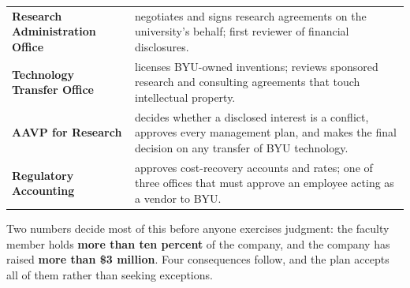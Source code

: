 \documentclass[11pt]{article}
\begin{document}
{\small
\setlength{\extrarowheight}{2pt}
\begin{tabular}{@{} >{\RaggedRight\arraybackslash}p{2.1in} >{\RaggedRight\arraybackslash}p{4.35in} @{}}
\textbf{Research Administration Office} &
negotiates and signs research agreements on the university's behalf; first
reviewer of financial disclosures. \\
\textbf{Technology Transfer Office} &
licenses BYU-owned inventions; reviews sponsored research and consulting
agreements that touch intellectual property. \\
\textbf{AAVP for Research} &
decides whether a disclosed interest is a conflict, approves every management
plan, and makes the final decision on any transfer of BYU technology. \\
\textbf{Regulatory Accounting} &
approves cost-recovery accounts and rates; one of three offices that must
approve an employee acting as a vendor to BYU. \\
\end{tabular}}

\label{sec:numbers}

Two numbers decide most of this before anyone exercises judgment: the faculty
member holds \textbf{more than ten percent} of the company, and the company
has raised \textbf{more than \$3 million}. Four consequences follow, and the plan
accepts all of them rather than seeking exceptions.
\end{document}
